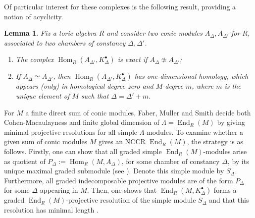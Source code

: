 \documentclass[reqno, 12pt]{amsart}
\newtheorem{lemma}[theorem]{Lemma}
\theoremstyle{definition}
\numberwithin{equation}{section}
\newcommand{\Hom}{\operatorname{Hom}}
\newcommand{\End}{\operatorname{End}}
\begin{document}
Of particular interest for these complexes is the following result, providing a notion of acyclicity.
\begin{lemma}
    \label{Lem:Acyc}
    Fix a toric algebra $R$ and consider two conic modules $A_\Delta, A_{\Delta'}$ for $R$, associated to two chambers of constancy $\Delta, \Delta'$.
    \begin{enumerate}
        \item The complex $\Hom_R(A_{\Delta'},K_\Delta^\bullet)$ is exact if $A_\Delta\not\simeq A_{\Delta'}$;
        \item If $A_\Delta\simeq A_{\Delta'}$, then $\Hom_R(A_{\Delta'},K_\Delta^\bullet)$ has one-dimensional homology, which appears (only) in homological degree zero and $M$-degree $m$, where $m$ is the unique element of $M$ such that $\Delta=\Delta'+m$.
    \end{enumerate}
\end{lemma}
 For $M$ a finite direct sum of conic modules, Faber, Muller and Smith decide both Cohen-Macaulayness and finite global dimension of $\Lambda=\End_R(M)$ by giving minimal projective resolutions for all simple $\Lambda$-modules. To examine whether a given sum of conic modules $M$ gives an NCCR $\End_R(M)$, the strategy is as follows. Firstly, one can show that all graded simple $\End_R(M)$-modules arise as quotient of $P_\Delta:=\Hom_R(M,A_\Delta)$, for some chamber of constancy $\Delta$, by its unique maximal graded submodule (see \cite[Proposition 6.3]{FMS19}). Denote this simple module by $S_\Delta$. Furthermore, all graded indecomposable projective modules are of the form $P_\Delta$ for some $\Delta$ appearing in $M$. Then, one shows that $\End_R(M,K_\Delta^\bullet)$ forms a graded $\End_R(M)$-projective resolution of the simple module $S_\Delta$ and that this resolution has minimal length \cite[Theorem 6.5]{FMS19}. 
\end{document}
